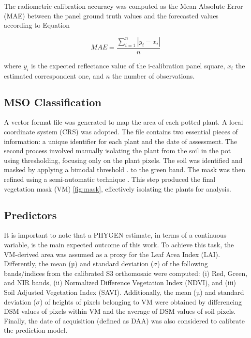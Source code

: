 \documentclass[12pt,a4paper,oneside]{report}
\begin{document}
The radiometric calibration accuracy was computed as the Mean Absolute Error (MAE) between the panel ground truth values and the forecasted values
\cite{wyattRadiometricCalibrationTheory2012} according to Equation

\begin{equation}
    MAE = \frac{\sum_{i=1}^{n} \left| y_i - x_i \right|}{n}
\end{equation}

where $y_i$  is the expected reflectance value of the i-calibration panel square,
$x_i$ the estimated correspondent one, and $n$ the number of observations.

\subsection{MSO Classification}

A vector format file was generated to map the area of each potted plant. A local coordinate system (CRS) was adopted. The file contains two essential pieces of information: a unique identifier for each plant and the date of assessment. The second process involved manually isolating the plant from the soil in the pot using thresholding, focusing only on the plant pixels. The soil was identified and masked by applying a bimodal threshold 
\cite{otsuThresholdSelectionMethod1979}.
to the green band. The mask was then refined using a semi-automatic technique
\cite{rotherGrabCutInteractiveForeground2004}.
This step produced the final vegetation mask (VM) \cref{fig:mask}, effectively isolating the plants for analysis.

\subsection{Predictors}

It is important to note that a PHYGEN estimate, in terms of a continuous variable, 
is the main expected outcome of this work. To achieve this task, the VM-derived 
area was assumed as a proxy for the Leaf Area Index (LAI). Differently, the mean (µ) 
and standard deviation ($\sigma$) of the following bands/indices from the calibrated S3 
orthomosaic were computed: (i) Red, Green, and NIR bands, (ii) Normalized Difference 
Vegetation Index (NDVI), and (iii) Soil Adjusted Vegetation Index (SAVI).
Additionally, the mean (µ) and standard deviation ($\sigma$) of heights of pixels 
belonging to VM were obtained by differencing DSM values of pixels within VM and 
the average of DSM values of soil pixels.
Finally, the date of acquisition (defined as DAA) was also considered to calibrate 
the prediction model.
\end{document}
